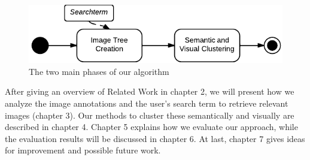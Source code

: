 \begin{figure}[h]
\centering
\includegraphics[]{images/search_process_highlevel.pdf}
\caption{The two main phases of our algorithm}
\label{fig_overallprocess}
\end{figure}

\bigskip

After giving an overview of Related Work in chapter 2, we will present how we analyze the image annotations and the user's search term to retrieve relevant images (chapter 3). Our methods to cluster these semantically and visually are described in chapter 4. Chapter 5 explains how we evaluate our approach, while the evaluation results will be discussed in chapter 6. At last, chapter 7 gives ideas for improvement and possible future work.
